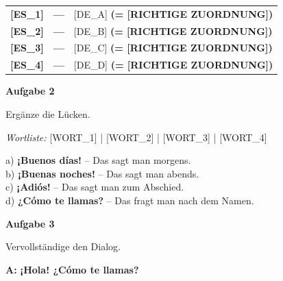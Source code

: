 \documentclass[11pt, a4paper]{article}
\newcommand{\fachfarbe}{spanisch}
\newcommand{\punktebox}[1]{\hfill\fbox{\small \_/#1}}
\newcommand{\loesung}[1]{\textcolor{loesung}{\textbf{#1}}}
\newenvironment{aufgabe}[1]{%
    \needspace{5\baselineskip}%
    \nopagebreak[4]%
    \vspace{10pt}
    \noindent\textbf{\textcolor{\fachfarbe}{Aufgabe #1}}
    \nopagebreak[4]%
    \vspace{5pt}
    \nopagebreak[4]%
    \begin{list}{}{\leftmargin=0pt}
    \item[]
}{%
    \end{list}
}
\newcommand{\es}[1]{\textcolor{\fachfarbe}{\textbf{#1}}}
\begin{document}
\begin{center}
\begin{tabular}{rcl}
\es{[ES\_1]} & \loesung{---} & [DE\_A] \loesung{(= [RICHTIGE ZUORDNUNG])} \\[0.8em]
\es{[ES\_2]} & \loesung{---} & [DE\_B] \loesung{(= [RICHTIGE ZUORDNUNG])} \\[0.8em]
\es{[ES\_3]} & \loesung{---} & [DE\_C] \loesung{(= [RICHTIGE ZUORDNUNG])} \\[0.8em]
\es{[ES\_4]} & \loesung{---} & [DE\_D] \loesung{(= [RICHTIGE ZUORDNUNG])} \\
\end{tabular}
\end{center}

\vspace{15pt}


\begin{aufgabe}{2}
Ergänze die Lücken. \punktebox{4}
\end{aufgabe}

\begin{vokabelkasten}
\textit{Wortliste:} [WORT\_1] | [WORT\_2] | [WORT\_3] | [WORT\_4]
\end{vokabelkasten}

\vspace{0.5em}

\noindent
a) \es{¡\loesung{Buenos días}!} -- Das sagt man morgens. \\[0.8em]
b) \es{¡\loesung{Buenas noches}!} -- Das sagt man abends. \\[0.8em]
c) \es{¡\loesung{Adiós}!} -- Das sagt man zum Abschied. \\[0.8em]
d) \es{¿\loesung{Cómo te llamas}?} -- Das fragt man nach dem Namen. \\

\vspace{15pt}


\begin{aufgabe}{3}
Vervollständige den Dialog. \punktebox{6}
\end{aufgabe}

\noindent
\textbf{A:} \es{¡Hola! ¿Cómo te llamas?}
\end{document}
